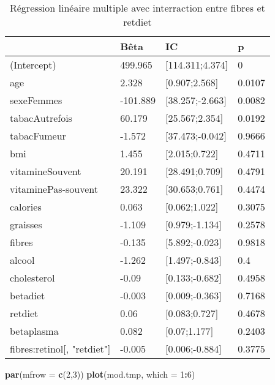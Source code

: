 \documentclass[]{article}
\newenvironment{Shaded}{\begin{snugshade}}{\end{snugshade}}
\newcommand{\KeywordTok}[1]{\textcolor[rgb]{0.13,0.29,0.53}{\textbf{#1}}}
\newcommand{\DataTypeTok}[1]{\textcolor[rgb]{0.13,0.29,0.53}{#1}}
\newcommand{\DecValTok}[1]{\textcolor[rgb]{0.00,0.00,0.81}{#1}}
\newcommand{\OperatorTok}[1]{\textcolor[rgb]{0.81,0.36,0.00}{\textbf{#1}}}
\newcommand{\NormalTok}[1]{#1}
\begin{document}
\begin{table}

\caption{\label{tab:unnamed-chunk-76}Régression linéaire multiple avec interraction entre fibres et retdiet}
\centering
\begin{tabular}[t]{l|l|l|l}
\hline
  & Bêta & IC & p\\
\hline
\rowcolor[HTML]{BBD2E1}  (Intercept) & 499.965 & [114.311;4.374] & 0\\
\hline
age & 2.328 & [0.907;2.568] & 0.0107\\
\hline
\rowcolor[HTML]{BBD2E1}  sexeFemmes & -101.889 & [38.257;-2.663] & 0.0082\\
\hline
tabacAutrefois & 60.179 & [25.567;2.354] & 0.0192\\
\hline
\rowcolor[HTML]{BBD2E1}  tabacFumeur & -1.572 & [37.473;-0.042] & 0.9666\\
\hline
bmi & 1.455 & [2.015;0.722] & 0.4711\\
\hline
\rowcolor[HTML]{BBD2E1}  vitamineSouvent & 20.191 & [28.491;0.709] & 0.4791\\
\hline
vitaminePas-souvent & 23.322 & [30.653;0.761] & 0.4474\\
\hline
\rowcolor[HTML]{BBD2E1}  calories & 0.063 & [0.062;1.022] & 0.3075\\
\hline
graisses & -1.109 & [0.979;-1.134] & 0.2578\\
\hline
\rowcolor[HTML]{BBD2E1}  fibres & -0.135 & [5.892;-0.023] & 0.9818\\
\hline
alcool & -1.262 & [1.497;-0.843] & 0.4\\
\hline
\rowcolor[HTML]{BBD2E1}  cholesterol & -0.09 & [0.133;-0.682] & 0.4958\\
\hline
betadiet & -0.003 & [0.009;-0.363] & 0.7168\\
\hline
\rowcolor[HTML]{BBD2E1}  retdiet & 0.06 & [0.083;0.727] & 0.4678\\
\hline
betaplasma & 0.082 & [0.07;1.177] & 0.2403\\
\hline
\rowcolor[HTML]{BBD2E1}  fibres:retinol[, "retdiet"] & -0.005 & [0.006;-0.884] & 0.3775\\
\hline
\end{tabular}
\end{table}

\begin{Shaded}
\begin{Highlighting}[]
\KeywordTok{par}\NormalTok{(}\DataTypeTok{mfrow =} \KeywordTok{c}\NormalTok{(}\DecValTok{2}\NormalTok{,}\DecValTok{3}\NormalTok{))}
\KeywordTok{plot}\NormalTok{(mod.tmp, }\DataTypeTok{which =} \DecValTok{1}\OperatorTok{:}\DecValTok{6}\NormalTok{)}
\end{Highlighting}
\end{Shaded}
\end{document}
